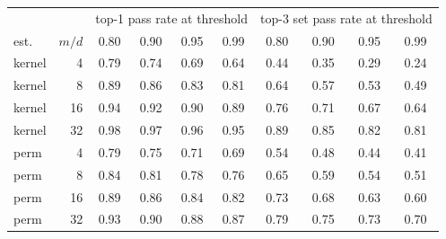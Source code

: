 \begin{tabular}{lr|cccc|cccc}
\toprule
& & \multicolumn{4}{c|}{top-1 pass rate at threshold} & \multicolumn{4}{c}{top-3 set pass rate at threshold}\\
est. & $m/d$ & 0.80 & 0.90 & 0.95 & 0.99 & 0.80 & 0.90 & 0.95 & 0.99\\
\midrule
kernel & 4 & 0.79 & 0.74 & 0.69 & 0.64 & 0.44 & 0.35 & 0.29 & 0.24\\
kernel & 8 & 0.89 & 0.86 & 0.83 & 0.81 & 0.64 & 0.57 & 0.53 & 0.49\\
kernel & 16 & 0.94 & 0.92 & 0.90 & 0.89 & 0.76 & 0.71 & 0.67 & 0.64\\
kernel & 32 & 0.98 & 0.97 & 0.96 & 0.95 & 0.89 & 0.85 & 0.82 & 0.81\\
\midrule
perm & 4 & 0.79 & 0.75 & 0.71 & 0.69 & 0.54 & 0.48 & 0.44 & 0.41\\
perm & 8 & 0.84 & 0.81 & 0.78 & 0.76 & 0.65 & 0.59 & 0.54 & 0.51\\
perm & 16 & 0.89 & 0.86 & 0.84 & 0.82 & 0.73 & 0.68 & 0.63 & 0.60\\
perm & 32 & 0.93 & 0.90 & 0.88 & 0.87 & 0.79 & 0.75 & 0.73 & 0.70\\
\bottomrule
\end{tabular}
